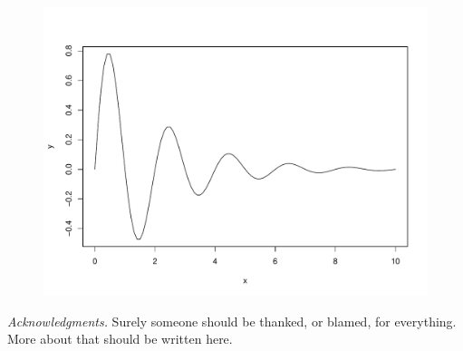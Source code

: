 \documentclass[12pt,titlepage,figuresatend]{article}
\begin{document}
\begin{figure}[p!]
  \centering\includegraphics[width=\hsize]{figure1}
  \caption[Caption for second figure.]{\label{figure1}}
\end{figure}

 
\bigskip
\emph{Acknowledgments.}
Surely someone should be thanked, or blamed, for everything.  More about that should be written here.



\end{document}
